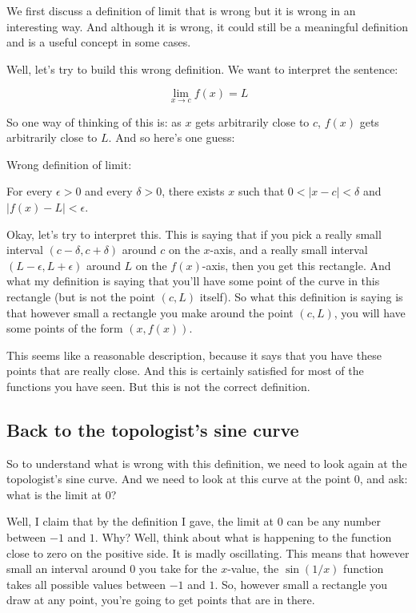 \documentclass[10pt]{amsart}
\begin{document}
We first discuss a definition of limit that is wrong but it is wrong
in an interesting way. And although it is wrong, it could still be a
meaningful definition and is a useful concept in some cases.

Well, let's try to build this wrong definition. We want to interpret
the sentence:

\begin{equation*}
  \lim_{x \to c} f(x) = L
\end{equation*}

So one way of thinking of this is: as $x$ gets arbitrarily close to
$c$, $f(x)$ gets arbitrarily close to $L$. And so here's one guess:

Wrong definition of limit:

For every $\epsilon > 0$ and every $\delta > 0$, there exists $x$ such
that $0 < |x - c| < \delta$ and $|f(x) - L| < \epsilon$.

Okay, let's try to interpret this. This is saying that if you pick a
really small interval $(c - \delta, c + \delta)$ around $c$ on the
$x$-axis, and a really small interval $(L - \epsilon, L + \epsilon)$
around $L$ on the $f(x)$-axis, then you get this rectangle. And what
my definition is saying that you'll have some point of the curve in
this rectangle (but is not the point $(c,L)$ itself). So what this
definition is saying is that however small a rectangle you make around
the point $(c,L)$, you will have some points of the form $(x,f(x))$.

This seems like a reasonable description, because it says that you
have these points that are really close. And this is certainly
satisfied for most of the functions you have seen. But this is not the
correct definition.

\subsection{Back to the topologist's sine curve}

So to understand what is wrong with this definition, we need to look
again at the topologist's sine curve. And we need to look at this
curve at the point $0$, and ask: what is the limit at $0$?

Well, I claim that by the definition I gave, the limit at $0$ can be
any number between $-1$ and $1$. Why? Well, think about what is
happening to the function close to zero on the positive side. It is
madly oscillating. This means that however small an interval around
$0$ you take for the $x$-value, the $\sin(1/x)$ function takes all
possible values between $-1$ and $1$. So, however small a rectangle
you draw at any point, you're going to get points that are in there.
\end{document}
